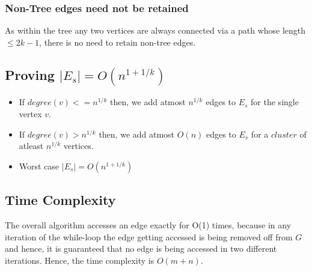 \documentclass{article}
\begin{document}
\subsubsection{Non-Tree edges need not be retained}
As within the tree any two vertices are always connected via a path whose length $\leq 2k-1$, there is no need to retain non-tree edges.

\subsection{Proving $|E_s| = O(n^{1+1/k}) $}
\begin{itemize}
\item If $degree(v) <= n^{1/k}$ then, we add atmost $n^{1/k}$ edges to $E_s$ for the single vertex $v$.
\item If $degree(v) > n^{1/k}$ then, we add atmost $O(n)$ edges to $E_s$ for a $cluster$ of atleast $n^{1/k}$ vertices.
\item Worst case $|E_s|  =  O(n^{1+1/k})$ 
\end{itemize}
\subsection{Time Complexity}
The overall algorithm accesses an edge exactly for O(1) times, because in any iteration of the while-loop the edge getting accessed is being removed off from $G$ and hence, it is guaranteed that no edge is being accessed in two different iterations. Hence, the time complexity is $O(m+n)$.    
\end{document}
